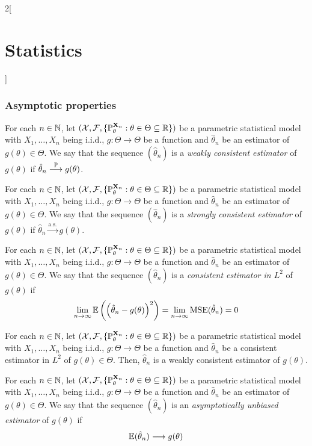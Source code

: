 \documentclass[../../../main_math.tex]{subfiles}
\begin{document}
\begin{multicols}{2}[\section{Statistics}]
  \subsubsection{Asymptotic properties}
  \begin{definition}
    For each $n\in\mathbb{N}$, let $(\mathcal{X},\mathcal{F},\{\mathbb{P}_{\theta}^{\boldsymbol{\mathrm{X}}_n}:\theta\in\Theta\subseteq \mathbb{R}\})$ be a parametric statistical model with $X_1,\ldots,X_n$ being i.i.d., $g:\Theta\rightarrow\Theta$ be a function and ${\hat\theta}_n$ be an estimator of $g({\theta})\in\Theta$. We say that the sequence $({{\hat\theta}}_n)$ is a \emph{weakly consistent estimator} of $g(\theta)$ if ${{\hat\theta}}_n\overset{\mathbb{P}}{\longrightarrow}g(\theta)$.
  \end{definition}
  \begin{definition}
    For each $n\in\mathbb{N}$, let $(\mathcal{X},\mathcal{F},\{\mathbb{P}_{\theta}^{\boldsymbol{\mathrm{X}}_n}:\theta\in\Theta\subseteq \mathbb{R}\})$ be a parametric statistical model with $X_1,\ldots,X_n$ being i.i.d., $g:\Theta\rightarrow\Theta$ be a function and ${\hat\theta}_n$ be an estimator of $g({\theta})\in\Theta$. We say that the sequence $({{\hat\theta}}_n)$ is a \emph{strongly consistent estimator} of $g(\theta)$ if ${{\hat\theta}}_n\overset{\text{a.s.}}{\longrightarrow}g(\theta)$.
  \end{definition}
  \begin{definition}
    For each $n\in\mathbb{N}$, let $(\mathcal{X},\mathcal{F},\{\mathbb{P}_{\theta}^{\boldsymbol{\mathrm{X}}_n}:\theta\in\Theta\subseteq \mathbb{R}\})$ be a parametric statistical model with $X_1,\ldots,X_n$ being i.i.d., $g:\Theta\rightarrow\Theta$ be a function and ${\hat\theta}_n$ be an estimator of $g({\theta})\in\Theta$. We say that the sequence $({{\hat\theta}}_n)$ is a \emph{consistent estimator in $L^2$} of $g(\theta)$ if $$\lim_{n\to\infty}\mathbb{E}\left({\left({\hat\theta}_n-g({\theta})\right)}^2\right)=\lim_{n\to\infty}\operatorname{MSE}({\hat\theta}_n)=0$$
  \end{definition}
  \begin{proposition}
    For each $n\in\mathbb{N}$, let $(\mathcal{X},\mathcal{F},\{\mathbb{P}_{\theta}^{\boldsymbol{\mathrm{X}}_n}:\theta\in\Theta\subseteq \mathbb{R}\})$ be a parametric statistical model with $X_1,\ldots,X_n$ being i.i.d., $g:\Theta\rightarrow\Theta$ be a function and ${\hat\theta}_n$ be a consistent estimator in $L^2$ of $g({\theta})\in\Theta$. Then, ${{\hat\theta}}_n$ is a weakly consistent estimator of $g(\theta)$.
  \end{proposition}
  \begin{definition}
    For each $n\in\mathbb{N}$, let $(\mathcal{X},\mathcal{F},\{\mathbb{P}_{\theta}^{\boldsymbol{\mathrm{X}}_n}:\theta\in\Theta\subseteq \mathbb{R}\})$ be a parametric statistical model with $X_1,\ldots,X_n$ being i.i.d., $g:\Theta\rightarrow\Theta$ be a function and ${{\hat\theta}}_n$ be an estimator of $g(\theta)\in\Theta$. We say that the sequence $({{\hat\theta}}_n)$ is an \emph{asymptotically unbiased estimator} of $g(\theta)$ if $$\mathbb{E}({{\hat\theta}}_n)\longrightarrow g(\theta)$$

\end{definition}
\end{multicols}
\end{document}
